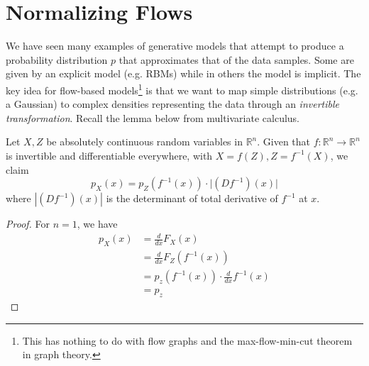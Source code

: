 \section{Normalizing Flows} 

  We have seen many examples of generative models that attempt to produce a probability distribution $p$ that approximates that of the data samples. Some are given by an explicit model (e.g. RBMs) while in others the model is implicit. The key idea for flow-based models\footnote{This has nothing to do with flow graphs and the max-flow-min-cut theorem in graph theory.} is that we want to map simple distributions (e.g. a Gaussian) to complex densities representing the data through an \textit{invertible transformation}. Recall the lemma below from multivariate calculus. 

  \begin{lemma}[Jacobi] 
    Let $X, Z$ be absolutely continuous random variables in $\mathbb{R}^n$. 
    Given that $f: \mathbb{R}^n \rightarrow \mathbb{R}^n$ is invertible and differentiable everywhere, with $X = f(Z), Z = f^{-1} (X)$, we claim 
    \begin{equation}
      p_X (x) = p_Z (f^{-1} (x)) \cdot \big| (D f^{-1}) (x) \big|
    \end{equation} 
    where $|(D f^{-1}) (x)|$ is the determinant of total derivative of $f^{-1}$ at $x$. 
  \end{lemma}
  \begin{proof}
    For $n = 1$, we have 
    \begin{align}
      p_X (x) & = \frac{d}{dx} F_X (x) \\
              & = \frac{d}{dx} F_Z (f^{-1}(x)) \\
              & = p_z (f^{-1} (x)) \cdot \frac{d}{dx} f^{-1} (x)  \\
              & = p_z 
    \end{align}
  \end{proof} 

